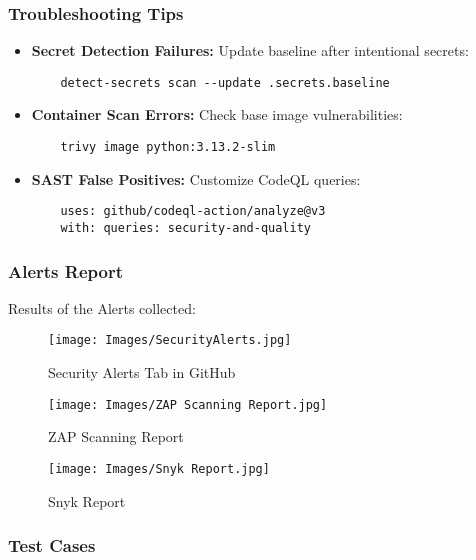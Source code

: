 \documentclass[conference]{IEEEtran}
\begin{document}
\subsubsection*{Troubleshooting Tips}
\begin{itemize}
    \item \textbf{Secret Detection Failures:} Update baseline after intentional secrets:
    \begin{verbatim}
    detect-secrets scan --update .secrets.baseline
    \end{verbatim}
    
    \item \textbf{Container Scan Errors:} Check base image vulnerabilities:
    \begin{verbatim}
    trivy image python:3.13.2-slim
    \end{verbatim}
    
    \item \textbf{SAST False Positives:} Customize CodeQL queries:
    \begin{verbatim}
    uses: github/codeql-action/analyze@v3
    with: queries: security-and-quality
    \end{verbatim}
\end{itemize}

\subsubsection*{Alerts Report}

Results of the Alerts collected:

\begin{figure}[H]
    \centering
    \texttt{[image: Images/SecurityAlerts.jpg]}
    \caption{Security Alerts Tab in GitHub}
    \label{fig:security_alerts}
\end{figure}

\begin{figure}[H] 
    \centering 
    \texttt{[image: Images/ZAP Scanning Report.jpg]} 
    \caption{ZAP Scanning Report} 
    \label{fig:zap_scanning_report} 
\end{figure}

\begin{figure}[H] 
    \centering 
    \texttt{[image: Images/Snyk Report.jpg]} 
    \caption{Snyk Report} 
    \label{fig:snyk_report} 
\end{figure}

\subsubsection*{Test Cases}
\end{document}

